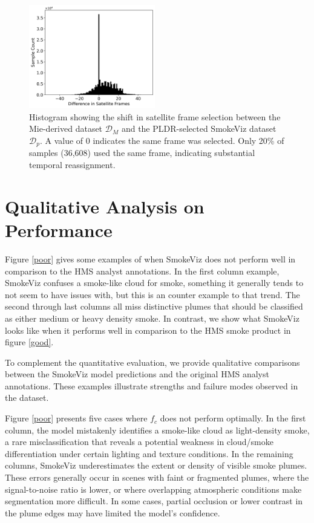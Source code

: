 \documentclass{article}
\begin{document}
\begin{figure}[!htb]
    \centering
        \includegraphics[width=0.49\textwidth]{stat_figs/sample_count_vs_diff_frames.png}
        \caption{Histogram showing the shift in satellite frame selection between the Mie-derived dataset \(\mathcal{D}_M\) and the PLDR-selected SmokeViz dataset \(\mathcal{D}_p\). A value of 0 indicates the same frame was selected. Only 20\% of samples (36,608) used the same frame, indicating substantial temporal reassignment.}
        \label{frame_diff}
\end{figure}



\section{Qualitative Analysis on Performance}

Figure \ref{poor} gives some examples of when SmokeViz does not perform well in comparison to the HMS analyst annotations. In the first column example, SmokeViz confuses a smoke-like cloud for smoke, something it generally tends to not seem to have issues with, but this is an counter example to that trend. The second through last columns all miss distinctive plumes that should be classified as either medium or heavy density smoke. In contrast, we show what SmokeViz looks like when it performs well in comparison to the HMS smoke product in figure \ref{good}.

To complement the quantitative evaluation, we provide qualitative comparisons between the SmokeViz model predictions and the original HMS analyst annotations. These examples illustrate strengths and failure modes observed in the dataset.

Figure \ref{poor} presents five cases where \(f_c\) does not perform optimally. In the first column, the model mistakenly identifies a smoke-like cloud as light-density smoke, a rare misclassification that reveals a potential weakness in cloud/smoke differentiation under certain lighting and texture conditions. In the remaining columns, SmokeViz underestimates the extent or density of visible smoke plumes. These errors generally occur in scenes with faint or fragmented plumes, where the signal-to-noise ratio is lower, or where overlapping atmospheric conditions make segmentation more difficult. In some cases, partial occlusion or lower contrast in the plume edges may have limited the model's confidence.
\end{document}
